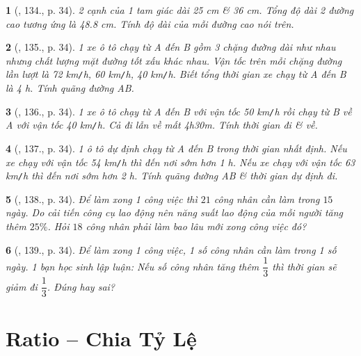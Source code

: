 \documentclass{article}
\newtheorem{baitoan}{}
\begin{document}
\begin{baitoan}[\cite{Tuyen_Toan_7}, 134., p. 34]
	2 cạnh của 1 tam giác dài {\rm25 cm} \& {\rm36 cm}. Tổng độ dài 2 đường cao tương ứng là {\rm48.8 cm}. Tính độ dài của mỗi đường cao nói trên.
\end{baitoan}

\begin{baitoan}[\cite{Tuyen_Toan_7}, 135., p. 34]
	1 xe ô tô chạy từ A đến B gồm 3 chặng đường dài như nhau nhưng chất lượng mặt đường tốt xấu khác nhau. Vận tốc trên mỗi chặng đường lần lượt là {\rm72 km{\tt/}h}, {\rm60 km{\tt/}h}, {\rm40 km{\tt/}h}. Biết tổng thời gian xe chạy từ A đến B là {\rm4 h}. Tính quãng đường AB.
\end{baitoan}

\begin{baitoan}[\cite{Tuyen_Toan_7}, 136., p. 34]	
	1 xe ô tô chạy từ A đến B với vận tốc {\rm50 km{\tt/}h} rồi chạy từ B về A với vận tốc {\rm40 km{\tt/}h}. Cả đi lẫn về mất {\rm4h30m}. Tính thời gian đi \& về.
\end{baitoan}

\begin{baitoan}[\cite{Tuyen_Toan_7}, 137., p. 34]
	1 ô tô dự định chạy từ A đến B trong thời gian nhất định. Nếu xe chạy với vận tốc {\rm54 km{\tt/}h} thì đến nơi sớm hơn {\rm1 h}. Nếu xe chạy với vận tốc {\rm63 km{\tt/}h} thì đến nơi sớm hơn {\rm2 h}. Tính quãng đường AB \& thời gian dự định đi.
\end{baitoan}

\begin{baitoan}[\cite{Tuyen_Toan_7}, 138., p. 34]
	Để làm xong 1 công việc thì $21$ công nhân cần làm trong $15$ ngày. Do cải tiến công cụ lao động nên năng suất lao động của mỗi người tăng thêm $25\%$. Hỏi $18$ công nhân phải làm bao lâu mới xong công việc đó?
\end{baitoan}

\begin{baitoan}[\cite{Tuyen_Toan_7}, 139., p. 34]
	Để làm xong 1 công việc, 1 số công nhân cần làm trong 1 số ngày. 1 bạn học sinh lập luận: Nếu số công nhân tăng thêm $\dfrac{1}{3}$ thì thời gian sẽ giảm đi $\dfrac{1}{3}$. Đúng hay sai?
\end{baitoan}


\section{Ratio -- Chia Tỷ Lệ}
\end{document}
